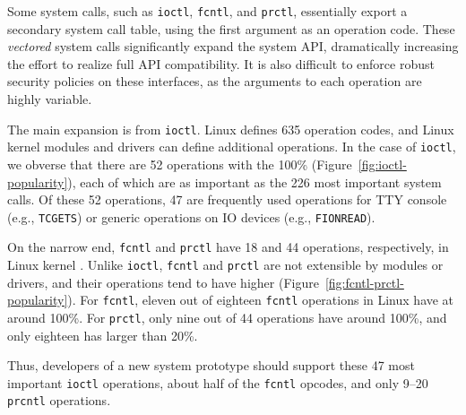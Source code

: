 
Some system calls, such as {\tt ioctl}, {\tt fcntl},
and {\tt prctl}, essentially export a secondary system call table, 
using the first argument as an operation code.
These {\it vectored} system calls significantly expand the system API, 
dramatically increasing the effort to realize full API compatibility.
It is also difficult to enforce robust security policies on these interfaces,
as the arguments to each operation are highly variable.


The main expansion is from {\tt ioctl}.
Linux defines 635 operation codes, and 
Linux kernel modules and drivers can define additional operations.
In the case of {\tt ioctl}, we obverse that there are 52 operations with the 100\% \usagemetric{} (Figure~\ref{fig:ioctl-popularity}),
each of which are as important as the 226 most important system calls.
Of these 52 operations,  47 are frequently used operations for TTY console (e.g., {\tt TCGETS}) or generic operations on IO devices (e.g., {\tt FIONREAD}).




On the narrow end, {\tt fcntl} and {\tt prctl} have 18 and 44 operations, respectively, in Linux kernel .
Unlike {\tt ioctl}, {\tt fcntl} and {\tt prctl} are not extensible by modules or drivers,
and their operations tend to have higher \usagemetric{} (Figure~\ref{fig:fcntl-prctl-popularity}).
For {\tt fcntl}, eleven out of eighteen {\tt fcntl} operations in Linux  have \usagemetric{} at around 100\%.
For {\tt prctl}, only nine out of 44 operations have \usagemetric{} around 100\%,
and only eighteen has \usagemetric{} larger than 20\%.


Thus, developers of a new system prototype should support these 47 most important {\tt ioctl}
operations, about half of the {\tt fcntl} opcodes, and only 9--20 {\tt prcntl} operations.


